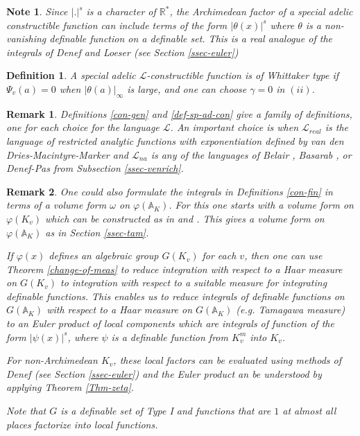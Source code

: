 \documentclass[12pt]{amsart}
\def\A{\mathbb{A}}
\def\R{\mathbb{R}}
\def\cL{\mathcal{L}}
\def\R{\mathbb{R}}
\def\cL{\mathcal{L}}
\newtheorem{Def}{Definition}[section]
\newtheorem{remark}{Remark}[section]
\numberwithin{equation}{section}
\newtheorem{note}{Note}[section]
\begin{document}
\begin{note} Since $|.|^s$ is a character of $\R^*$, the Archimedean factor of a special adelic constructible function can include terms of the form $|\theta(x)|^s$ where $\theta$ is a non-vanishing 
definable function on a definable set. This is a real analogue of the integrals of Denef and Loeser (see Section \ref{ssec-euler})\end{note}

\begin{Def}\label{def-Whitt} A special adelic $\cL$-constructible function is of Whittaker type if $\Psi_v(a)=0$ when $|\theta(a)|_{\infty}$ is large, and one can choose $\gamma=0$ in $(ii)$.
\end{Def}
\begin{remark} Definitions \ref{con-gen} and \ref{def-sp-ad-con} give a family of definitions, one for each choice for the language $\cL$. An important choice is when $\cL_{real}$ is the language 
of restricted analytic functions with exponentiation defined by van den Dries-Macintyre-Marker \cite{VMM} and $\cL_{na}$ is any of the languages of Belair \cite{Belair}, Basarab \cite{basarab}, or Denef-Pas \cite{pas} from Subsection \ref{ssec-venrich}.
\end{remark}
\begin{remark}\label{rem-real} 
One could also formulate the integrals in Definitions \ref{con-fin} in terms of a volume form $\omega$ on $\varphi(\A_K)$. 
For this one starts with a volume form on $\varphi(K_v)$ which can be constructed as in \cite{CL1} and 
\cite{CL2}. This gives a volume form on $\varphi(\A_K)$ as in Section \ref{ssec-tam}.

If $\varphi(x)$ defines an algebraic group $G(K_v)$ for each $v$, then one can use Theorem \ref{change-of-meas} to reduce integration with respect to a Haar measure on $G(K_v)$ to integration with respect to a suitable 
measure for integrating definable functions. This enables us to reduce integrals of definable functions on $G(\A_K)$ with respect to a Haar measure on $G(\A_K)$ (e.g. Tamagawa measure) to an Euler product of local components which are integrals of function of the form 
$|\psi(x)|^s$, where $\psi$ is a definable function from $K_v^m$ into $K_v$. 

For non-Archimedean $K_v$, these local factors can be evaluated using methods of Denef (see Section \ref{ssec-euler}) and the Euler product an be understood by applying 
Theorem \ref{Thm-zeta}. 

Note that $G$ is a definable set of Type I and functions that are $1$ at almost all places factorize into local functions.
\end{remark}
\end{document}

